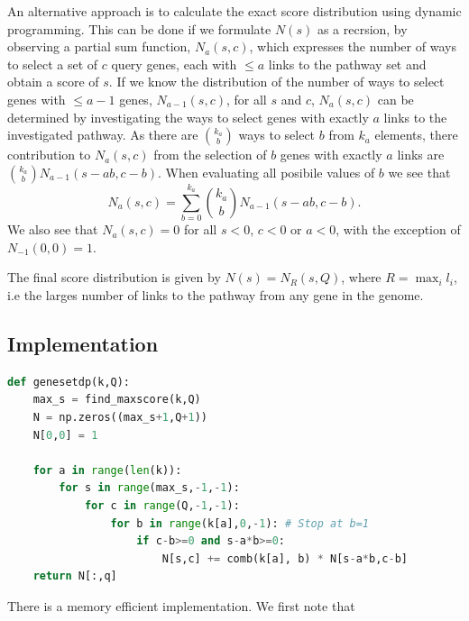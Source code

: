 \documentclass[10pt,letterpaper]{article}
\begin{document}
An alternative approach is to calculate the exact score distribution using dynamic programming. This can be done if we formulate $N(s)$ as a recrsion, by observing a partial sum function,  $N_a(s,c)$,
 which expresses the number of ways to select a set of $c$ query genes, each with $\le a$  links to the pathway set and obtain a score of $s$. If we know the distribution of the number of ways to select genes with $\le a-1$ genes,  $N_{a-1}(s,c)$, for all $s$ and $c$,   $N_a(s,c)$ can be determined by investigating the ways to select genes with exactly $a$ links to the investigated pathway.   As there are $k_a \choose b$ ways to select $b$ from $k_a$ elements, there contribution to $N_a(s,c)$ from the selection of  $b$ genes with exactly $a$ links are ${k_a \choose b} N_{a-1}(s-ab,c-b)$. When evaluating all posibile values of $b$ we see that
 \begin{equation}
N_a(s,c)=\sum_{b=0}^{k_a}{k_a \choose b} N_{a-1}(s-ab,c-b).
\end{equation}
We also see that $N_a(s,c)=0$ for all $s<0$, $c<0$ or $a<0$, with the exception of $N_{-1}(0,0)=1$.

The final score distribution is given by $N(s)=N_R(s,Q)$, where $R=\max_{i}{l_i}$, i.e the larges number of links to the pathway from any gene in the genome.


\subsection*{Implementation}

\begin{lstlisting}[language=Python, caption={ The central part of the dynamic programing algorithm for finding $N(s)$. The function takes the vector of links per gene, $k_a$, as well as the number of query genes, $Q$ as an input. The function depends on two additional functions {\tt find\_maxscore(k,Q)}, which calculates the maximal score a query of size $Q$ can obtain, and {\tt comb(a,b)}, which calculates $ a \choose b $.}, label=lst:gensetdp, captionpos=t, float, abovecaptionskip=-\medskipamount]
def genesetdp(k,Q):
    max_s = find_maxscore(k,Q)
    N = np.zeros((max_s+1,Q+1))
    N[0,0] = 1

    for a in range(len(k)):
        for s in range(max_s,-1,-1):
            for c in range(Q,-1,-1):
                for b in range(k[a],0,-1): # Stop at b=1
                    if c-b>=0 and s-a*b>=0:
                        N[s,c] += comb(k[a], b) * N[s-a*b,c-b]
    return N[:,q]
\end{lstlisting}
There is a memory efficient implementation. We first note that
\end{document}
